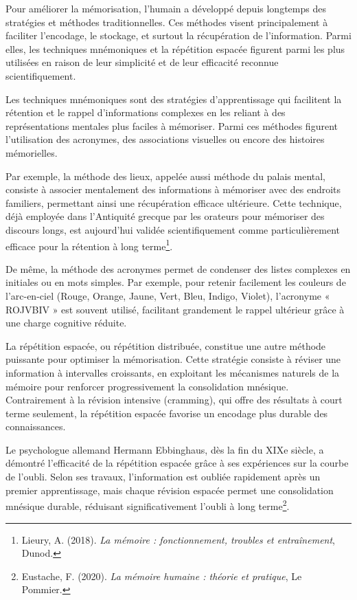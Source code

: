 \documentclass[11pt,a4paper]{report}
\begin{document}
Pour améliorer la mémorisation, l’humain a développé depuis longtemps des stratégies et méthodes traditionnelles. Ces méthodes visent principalement à faciliter l’encodage, le stockage, et surtout la récupération de l’information. Parmi elles, les techniques mnémoniques et la répétition espacée figurent parmi les plus utilisées en raison de leur simplicité et de leur efficacité reconnue scientifiquement.

Les techniques mnémoniques sont des stratégies d'apprentissage qui facilitent la rétention et le rappel d'informations complexes en les reliant à des représentations mentales plus faciles à mémoriser. Parmi ces méthodes figurent l'utilisation des acronymes, des associations visuelles ou encore des histoires mémorielles.

Par exemple, la méthode des lieux, appelée aussi méthode du palais mental, consiste à associer mentalement des informations à mémoriser avec des endroits familiers, permettant ainsi une récupération efficace ultérieure. Cette technique, déjà employée dans l’Antiquité grecque par les orateurs pour mémoriser des discours longs, est aujourd’hui validée scientifiquement comme particulièrement efficace pour la rétention à long terme\footnote{Lieury, A. (2018). \textit{La mémoire : fonctionnement, troubles et entraînement}, Dunod.}.

De même, la méthode des acronymes permet de condenser des listes complexes en initiales ou en mots simples. Par exemple, pour retenir facilement les couleurs de l’arc-en-ciel (Rouge, Orange, Jaune, Vert, Bleu, Indigo, Violet), l'acronyme « ROJVBIV » est souvent utilisé, facilitant grandement le rappel ultérieur grâce à une charge cognitive réduite.

La répétition espacée, ou répétition distribuée, constitue une autre méthode puissante pour optimiser la mémorisation. Cette stratégie consiste à réviser une information à intervalles croissants, en exploitant les mécanismes naturels de la mémoire pour renforcer progressivement la consolidation mnésique. Contrairement à la révision intensive (cramming), qui offre des résultats à court terme seulement, la répétition espacée favorise un encodage plus durable des connaissances.

Le psychologue allemand Hermann Ebbinghaus, dès la fin du XIXe siècle, a démontré l’efficacité de la répétition espacée grâce à ses expériences sur la courbe de l’oubli. Selon ses travaux, l'information est oubliée rapidement après un premier apprentissage, mais chaque révision espacée permet une consolidation mnésique durable, réduisant significativement l'oubli à long terme\footnote{Eustache, F. (2020). \textit{La mémoire humaine : théorie et pratique}, Le Pommier.}.
\end{document}
